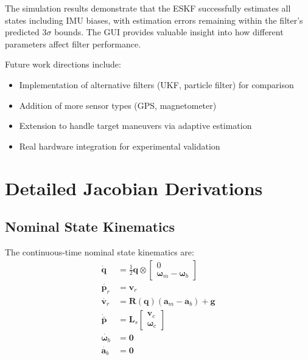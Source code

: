 \documentclass[11pt,a4paper]{article}
\newcommand{\quat}{\mathbf{q}}
\newcommand{\pr}{\mathbf{p}_r}
\newcommand{\vr}{\mathbf{v}_r}
\newcommand{\pbar}{\bar{\mathbf{p}}}
\newcommand{\bgyr}{\bm{\omega}_b}
\newcommand{\bacc}{\mathbf{a}_b}
\newcommand{\R}{\mathbf{R}}
\begin{document}
The simulation results demonstrate that the ESKF successfully estimates all states including IMU biases, with estimation errors remaining within the filter's predicted $3\sigma$ bounds. The GUI provides valuable insight into how different parameters affect filter performance.

Future work directions include:
\begin{itemize}
    \item Implementation of alternative filters (UKF, particle filter) for comparison
    \item Addition of more sensor types (GPS, magnetometer)
    \item Extension to handle target maneuvers via adaptive estimation
    \item Real hardware integration for experimental validation
\end{itemize}

\appendix

\section{Detailed Jacobian Derivations}
\label{app:jacobians}

\subsection{Nominal State Kinematics}
The continuous-time nominal state kinematics are:
\begin{align}
    \dot{\quat} &= \frac{1}{2} \quat \otimes \begin{bmatrix} 0 \\ \bm{\omega}_m - \bgyr \end{bmatrix} \\[8pt]
    \dot{\pr} &= \vr \\[8pt]
    \dot{\vr} &= \R(\quat)(\mathbf{a}_m - \bacc) + \mathbf{g} \\[8pt]
    \dot{\pbar} &= \mathbf{L}_s \begin{bmatrix} \mathbf{v}_c \\ \bm{\omega}_c \end{bmatrix} \\[8pt]
    \dot{\bgyr} &= \mathbf{0} \\[8pt]
    \dot{\bacc} &= \mathbf{0}
\end{align}
\end{document}
